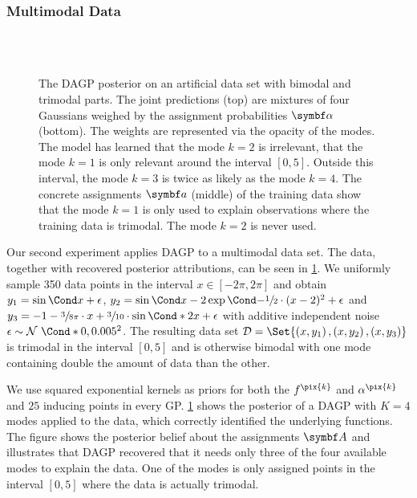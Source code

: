 \subsubsection{Multimodal Data}
\label{toc:data_association:semi_bimodal}
%
\begin{figure}[tp]
    \centering
    \\%
    \vspace{\figureskip}%
    \\%
    \vspace{\figureskip}%
    \caption{
        \label{fig:data_association:semi_bimodal}
        The DAGP posterior on an artificial data set with bimodal and trimodal parts.
        The joint predictions (top) are mixtures of four Gaussians weighed by the assignment probabilities $\mat{\alpha}$ (bottom).
        The weights are represented via the opacity of the modes.
        The model has learned that the mode $k = 2$ is irrelevant, that the mode $k = 1$ is only relevant around the interval $[0, 5]$.
        Outside this interval, the mode $k = 3$ is twice as likely as the mode $k = 4$.
        The concrete assignments $\mat{a}$ (middle) of the training data show that the mode $k = 1$ is only used to explain observations where the training data is trimodal.
        The mode $k = 2$ is never used.
    }
\end{figure}
%
Our second experiment applies DAGP to a multimodal data set.
The data, together with recovered posterior attributions, can be seen in \cref{fig:data_association:semi_bimodal}.
We uniformly sample 350 data points in the interval $x \in [-2\pi, 2\pi]$ and obtain $y_1 = \Fun{\sin}{x} + \epsilon$, $y_2 = \Fun{\sin}{x} - 2 \Fun{\exp}{-\sfrac{1}{2} \cdot (x-2)^2} + \epsilon$ and $y_3 = -1 - \sfrac{3}{8\pi} \cdot x + \sfrac{3}{10} \cdot \Fun*{\sin}{2x} + \epsilon$ with additive independent noise $\epsilon \sim \Gaussian*{0, 0.005^2}$.
The resulting data set $\Dc = \Set{\left( x, y_1 \right), \left( x, y_2 \right), \left( x, y_3 \right)}$ is trimodal in the interval $[0, 5]$ and is otherwise bimodal with one mode containing double the amount of data than the other.

We use squared exponential kernels as priors for both the $f^{\pix{k}}$ and $\alpha^{\pix{k}}$ and $25$ inducing points in every GP.
\cref{fig:data_association:semi_bimodal} shows the posterior of a DAGP with $K = 4$ modes applied to the data, which correctly identified the underlying functions.
The figure shows the posterior belief about the assignments $\mat{A}$ and illustrates that DAGP recovered that it needs only three of the four available modes to explain the data.
One of the modes is only assigned points in the interval $[0, 5]$ where the data is actually trimodal.

